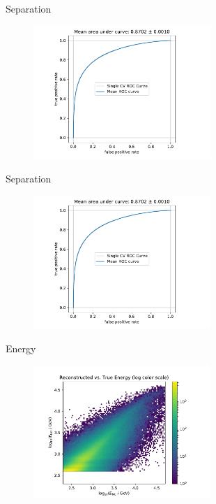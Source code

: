 \begin{frame}[t]{Separation}
    \begin{figure}
        \centering
        \includegraphics[width=0.6\textwidth,page=3]{fig/separation_performance.pdf}
    \end{figure}
\end{frame}

\begin{frame}[t]{Separation}
    \begin{figure}
        \centering
        \includegraphics[width=0.6\textwidth,page=4]{fig/separation_performance.pdf}
    \end{figure}
\end{frame}

\begin{frame}[t]{Energy}
    \begin{figure}
        \centering
        \includegraphics[width=0.6\textwidth,page=3]{fig/energy-performance.pdf}
    \end{figure}
\end{frame}

